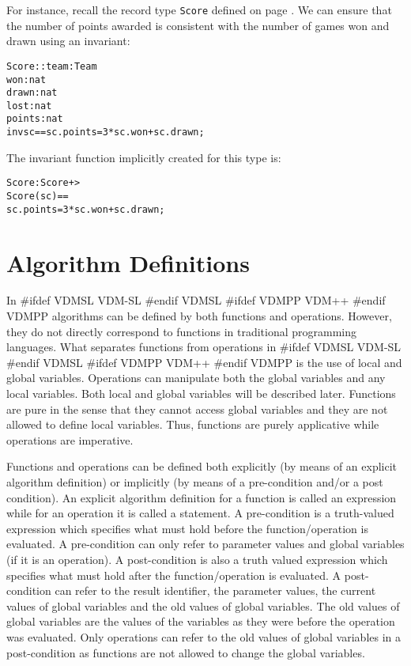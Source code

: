 \documentclass[\pformat,12pt]{article}
\newcommand{\vdmslpp}[2]{%
#ifdef VDMSL
#1
#endif VDMSL
#ifdef VDMPP
#2
#endif VDMPP
}
\newcommand{\vdmsl}{VDM-SL}
\newcommand{\vdmpp}{VDM++}
\begin{document}
For instance, recall the record type \texttt{Score} defined on page
\pageref{scoredef}. We can ensure that the number of points awarded
is consistent with the number of games won and drawn using an invariant:
\begin{alltt}
  Score :: team : Team
           won : nat
           drawn : nat
           lost : nat
           points : nat
  inv sc == sc.points = 3 * sc.won + sc.drawn;
\end{alltt}
The invariant function implicitly created for this type is:
\begin{alltt}
  Score : Score +> 
  Score (sc) == 
    sc.points = 3 * sc.won + sc.drawn;
\end{alltt}

\section{Algorithm Definitions}
\label{algorithm}


In \vdmslpp{\vdmsl}{\vdmpp} algorithms can be defined by both
functions and operations.  However, they do not directly correspond to
functions in traditional programming languages. What separates
functions from operations in \vdmslpp{\vdmsl}{\vdmpp} is the use of
local and global variables. Operations can manipulate both the global
variables and any local variables.  Both
local and global variables will be described later. Functions are pure in
the sense that they cannot access global variables and they are not
allowed to define local variables. Thus, functions are purely
applicative while operations are imperative.

Functions and operations can be defined both explicitly (by means of
an explicit algorithm definition) or implicitly (by means of a
pre-condition and/or a post condition).  An explicit algorithm
definition for a function is called an expression while for an
operation it is called a statement.  A pre-condition is a truth-valued
expression which specifies what must hold before the
function/operation is evaluated. A pre-condition can only refer to
parameter values and global variables (if it is an operation).  A
post-condition is also a truth valued expression which specifies what
must hold after the function/operation is evaluated. A post-condition
can refer to the result identifier, the parameter values, the current
values of global variables and the old values of global variables. The
old values of global variables are the values of the variables as they
were before the operation was evaluated.  Only operations can refer to
the old values of global variables in a post-condition as functions
are not allowed to change the global variables.
\end{document}
